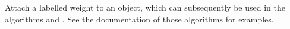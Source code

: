 
Attach a labelled weight to an object, which can subsequently be used
in the algorithms 
and . See the documentation of those
algorithms for examples.


